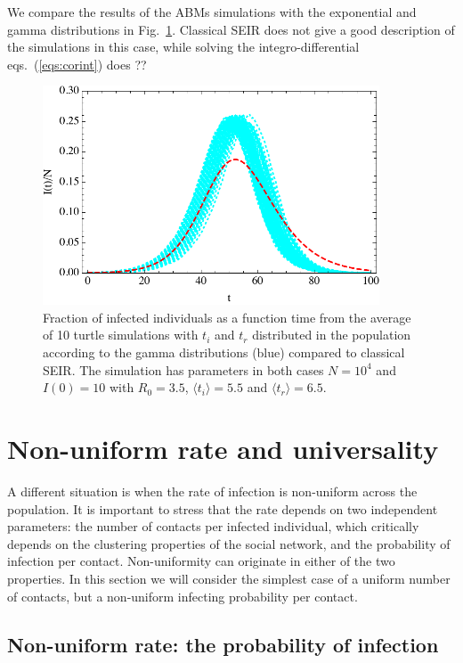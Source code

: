 \documentclass[a4paper,oneside,11pt]{article}
\begin{document}
We compare the results of the ABMs simulations with the exponential and gamma distributions in Fig.~\ref{fig:expvsgamma}. Classical SEIR does not give a good description of the simulations in this case, while solving the integro-differential eqs.~(\ref{eqs:corint}) does ?? 
\begin{figure}[h!]
  \centering
  \includegraphics[width=10cm]{GGvsSEIR.pdf}
  \caption{ Fraction of infected individuals as a function time from the average of 10 turtle simulations with $t_i$ and $t_r$ distributed in the population according to the gamma distributions (blue) compared to classical SEIR. The simulation has parameters in both cases $N=10^4$ and $I(0)=10$ with $R_0=3.5$, $\langle t_i\rangle=5.5$ and $\langle t_r\rangle=6.5$.  }
  \label{fig:expvsgamma}
   \end{figure}

\section{Non-uniform rate and universality }
\label{sec:r}
A different situation is when the rate of infection is non-uniform across the population. It is important to stress that the rate depends on two independent parameters: the number of contacts per infected individual, which critically depends on the clustering properties of the social network,  and the probability of infection per contact. Non-uniformity can originate in either of the two properties. In this section we will consider the simplest case of a uniform number of contacts, but a non-uniform infecting probability per contact.

\subsection{Non-uniform rate: the probability of infection}
\label{sec:prob}
\end{document}
